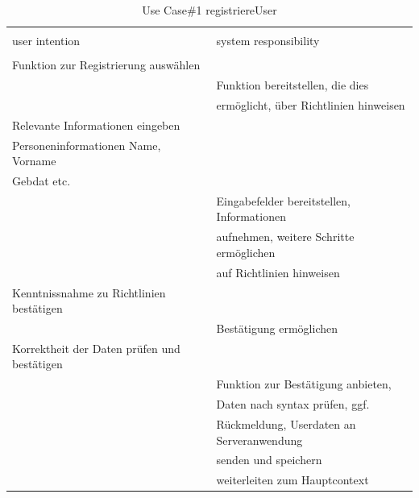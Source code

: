 \begin{table}[H]
\caption{Use Case\#1 registriereUser }
\centering
\begin{tabular}{l l}
\\ [-0.5ex]

\hline\hline
\\ [-0.5ex]
user intention & system responsibility
\\ [1.5ex]
\hline
\\ [-0.5ex]
Funktion zur Registrierung auswählen   &                                   \\[1ex]
                                       & Funktion bereitstellen, die dies    \\[1ex]
                                       & ermöglicht, über Richtlinien hinweisen       \\[1ex]

Relevante Informationen eingeben                       &                                   \\[1ex] 
Personeninformationen Name, Vorname  &                                   \\[1ex] 
Gebdat etc.   &                                   \\[1ex] 

                                       & Eingabefelder bereitstellen, Informationen    \\[1ex]
                                       & aufnehmen, weitere Schritte ermöglichen    \\[1ex]
                                       & auf Richtlinien hinweisen    \\[1ex]

Kenntnissnahme zu Richtlinien bestätigen        &                                   \\[1ex]
                                        & Bestätigung ermöglichen                 \\[1ex]
Korrektheit der Daten prüfen und bestätigen        &                                   \\[1ex]
                                       & Funktion zur Bestätigung anbieten,          \\[1ex]
                                       & Daten nach syntax prüfen, ggf.  \\[1ex]
                                       & Rückmeldung, Userdaten an Serveranwendung \\[1ex]
                                       & senden und speichern  \\[1ex]
                                       & weiterleiten zum Hauptcontext \\[1ex]
\hline
\end{tabular}
\label{tab:anmeldenUC}
\end{table}

